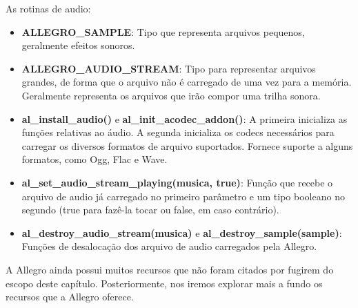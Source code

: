 \documentclass[a4paper,12pt]{report}
\begin{document}
% 
As rotinas de audio:
%
\begin{itemize}
 \item \textbf{ALLEGRO\_SAMPLE}: Tipo que representa arquivos pequenos, geralmente efeitos sonoros.
 \item \textbf{ALLEGRO\_AUDIO\_STREAM}: Tipo para representar arquivos grandes, de forma que o arquivo não é carregado de uma vez para a 
 memória. Geralmente representa os arquivos que irão compor uma trilha sonora.
 \item \textbf{al\_install\_audio()} e \textbf{al\_init\_acodec\_addon()}: A primeira inicializa as funções relativas ao áudio. A segunda inicializa os 
 codecs necessários para carregar os diversos formatos de arquivo suportados. Fornece suporte a alguns formatos, como Ogg, Flac e Wave.
 \item \textbf{al\_set\_audio\_stream\_playing(musica, true)}: Função que recebe o arquivo de audio já carregado no primeiro parâmetro e um tipo 
 booleano no segundo (true para fazê-la tocar ou false, em caso contrário).
 \item \textbf{al\_destroy\_audio\_stream(musica) } e \textbf{al\_destroy\_sample(sample)}: Funções de desalocação dos arquivo de audio carregados pela
 Allegro.
\end{itemize}
%
%
A Allegro ainda possui muitos recursos que não foram citados por fugirem do escopo deste capítulo. Posteriormente,
nos iremos explorar mais a fundo os recursos que a Allegro oferece.
%
%
\end{document}
